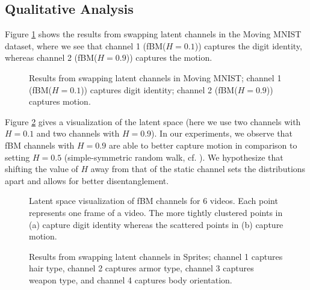 \documentclass[runningheads]{llncs}
\begin{document}
   \subsection{Qualitative Analysis}
      
   Figure \ref{bmnist} shows the results from swapping latent channels in the Moving MNIST dataset, where we see that channel 1 (fBM(\(H=0.1\))) captures the digit identity, whereas channel 2 (fBM(\(H=0.9\))) captures the motion. \par 

   \begin{figure} [H]
    \centering
   \caption{Results from swapping latent channels in Moving MNIST; channel 1 (fBM(\(H=0.1\))) captures digit identity; channel 2 (fBM(\(H=0.9\))) captures motion.}
   \label{bmnist}
   \end{figure}

   Figure \ref{fig:latent_vis} gives a visualization of the latent space (here we use two channels with $H = 0.1$ and two channels with $H = 0.9$). In our experiments, we observe that fBM channels with $H = 0.9$ are able to better capture motion in comparison to setting $H = 0.5$ (simple-symmetric random walk, cf. \cite{Grathwohl2016DisentanglingSA}). We hypothesize that shifting the value of $H$ away from that of the static channel sets the distributions apart and allows for better disentanglement. \par

   \begin{figure} [H]
   \centering  
   \caption{Latent space visualization of fBM channels for 6 videos. Each point represents one frame of a video. The more tightly clustered points in (a) capture digit identity whereas the scattered points in (b) capture motion.}
   \label{fig:latent_vis}
   \end{figure}
   
   \begin{figure} [H]
   \centering  
   \caption{Results from swapping latent channels in Sprites; channel 1 captures hair type, channel 2 captures armor type, channel 3 captures weapon type, and channel 4 captures body orientation.}
   \label{sprites}
   \end{figure}
 
\end{document}
